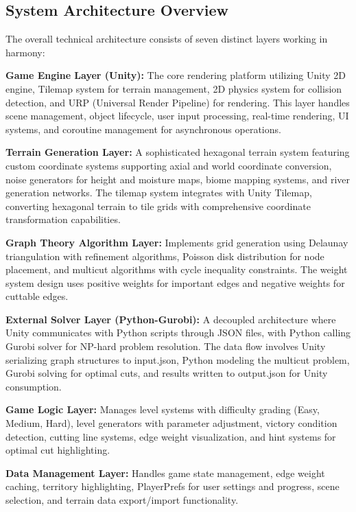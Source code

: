 \documentclass[english]{tudscrreprt}
\begin{document}
\subsection{System Architecture Overview}
The overall technical architecture consists of seven distinct layers working in harmony:

\textbf{Game Engine Layer (Unity):} The core rendering platform utilizing Unity 2D engine, Tilemap system for terrain management, 2D physics system for collision detection, and URP (Universal Render Pipeline) for rendering. This layer handles scene management, object lifecycle, user input processing, real-time rendering, UI systems, and coroutine management for asynchronous operations.

\textbf{Terrain Generation Layer:} A sophisticated hexagonal terrain system featuring custom coordinate systems supporting axial and world coordinate conversion, noise generators for height and moisture maps, biome mapping systems, and river generation networks. The tilemap system integrates with Unity Tilemap, converting hexagonal terrain to tile grids with comprehensive coordinate transformation capabilities.

\textbf{Graph Theory Algorithm Layer:} Implements grid generation using Delaunay triangulation with refinement algorithms, Poisson disk distribution for node placement, and multicut algorithms with cycle inequality constraints. The weight system design uses positive weights for important edges and negative weights for cuttable edges.

\textbf{External Solver Layer (Python-Gurobi):} A decoupled architecture where Unity communicates with Python scripts through JSON files, with Python calling Gurobi solver for NP-hard problem resolution. The data flow involves Unity serializing graph structures to input.json, Python modeling the multicut problem, Gurobi solving for optimal cuts, and results written to output.json for Unity consumption.

\textbf{Game Logic Layer:} Manages level systems with difficulty grading (Easy, Medium, Hard), level generators with parameter adjustment, victory condition detection, cutting line systems, edge weight visualization, and hint systems for optimal cut highlighting.

\textbf{Data Management Layer:} Handles game state management, edge weight caching, territory highlighting, PlayerPrefs for user settings and progress, scene selection, and terrain data export/import functionality.
\end{document}
